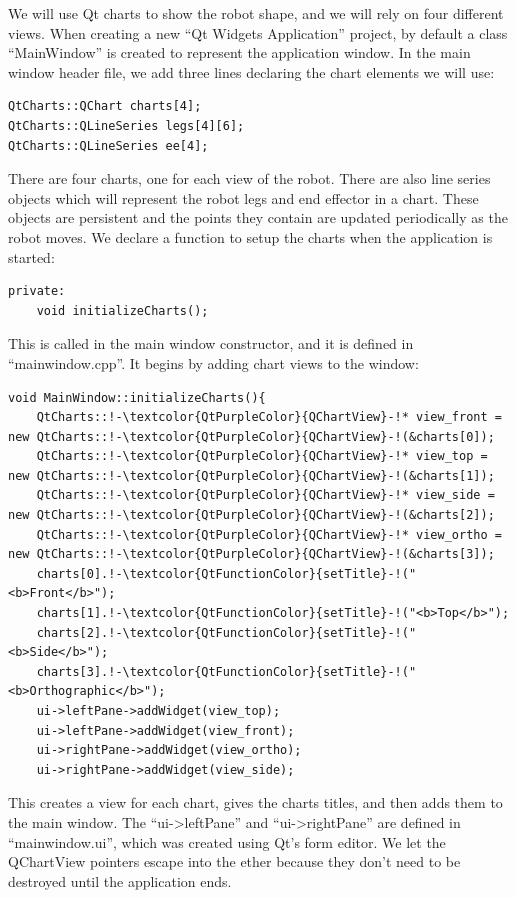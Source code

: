 \documentclass[12pt]{article}
\begin{document}
We will use Qt charts to show the robot shape, and we will rely on four different views. When creating a new ``Qt Widgets Application'' project, by default a class ``MainWindow'' is created to represent the application window. In the main window header file, we add three lines declaring the chart elements we will use:
\begin{lstlisting}
QtCharts::QChart charts[4];
QtCharts::QLineSeries legs[4][6];
QtCharts::QLineSeries ee[4];
\end{lstlisting}
There are four charts, one for each view of the robot. There are also line series objects which will represent the robot legs and end effector in a chart. These objects are persistent and the points they contain are updated periodically as the robot moves. We declare a function to setup the charts when the application is started:
\begin{lstlisting}
private:
    void initializeCharts();
\end{lstlisting}
This is called in the main window constructor, and it is defined in ``mainwindow.cpp''. It begins by adding chart views to the window:
\begin{lstlisting}
void MainWindow::initializeCharts(){
    QtCharts::!-\textcolor{QtPurpleColor}{QChartView}-!* view_front = new QtCharts::!-\textcolor{QtPurpleColor}{QChartView}-!(&charts[0]);
    QtCharts::!-\textcolor{QtPurpleColor}{QChartView}-!* view_top = new QtCharts::!-\textcolor{QtPurpleColor}{QChartView}-!(&charts[1]);
    QtCharts::!-\textcolor{QtPurpleColor}{QChartView}-!* view_side = new QtCharts::!-\textcolor{QtPurpleColor}{QChartView}-!(&charts[2]);
    QtCharts::!-\textcolor{QtPurpleColor}{QChartView}-!* view_ortho = new QtCharts::!-\textcolor{QtPurpleColor}{QChartView}-!(&charts[3]);
    charts[0].!-\textcolor{QtFunctionColor}{setTitle}-!("<b>Front</b>");
    charts[1].!-\textcolor{QtFunctionColor}{setTitle}-!("<b>Top</b>");
    charts[2].!-\textcolor{QtFunctionColor}{setTitle}-!("<b>Side</b>");
    charts[3].!-\textcolor{QtFunctionColor}{setTitle}-!("<b>Orthographic</b>");
    ui->leftPane->addWidget(view_top);
    ui->leftPane->addWidget(view_front);
    ui->rightPane->addWidget(view_ortho);
    ui->rightPane->addWidget(view_side);
\end{lstlisting}
This creates a view for each chart, gives the charts titles, and then adds them to the main window. The ``ui->leftPane'' and ``ui->rightPane'' are defined in ``mainwindow.ui'', which was created using Qt's form editor. We let the QChartView pointers escape into the ether because they don't need to be destroyed until the application ends.
\end{document}
